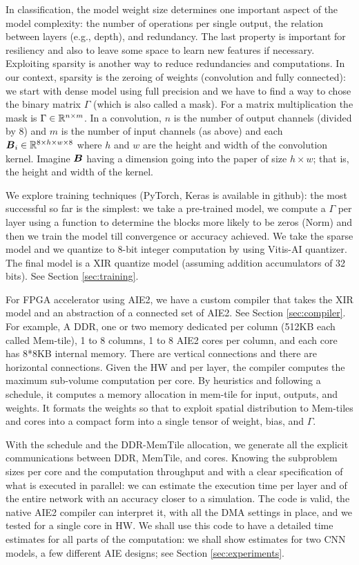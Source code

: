 \documentclass[conference]{IEEEtran}
\begin{document}
In classification, the model weight size determines one important
aspect of the model complexity: the number of operations per single
output, the relation between layers (e.g., depth), and redundancy. The
last property is important for resiliency and also to leave some space
to learn new features if necessary. Exploiting sparsity is another way
to reduce redundancies and computations. In our context, sparsity is
the zeroing of weights (convolution and fully connected): we start
with dense model using full precision and we have to find a way to
chose the binary matrix $\Gamma$ (which is also called a mask). For a
matrix multiplication the mask is $\Gamma \in \mathbb{R}^{n\times m}$. In a
convolution, $n$ is the number of output channels (divided by 8) and
$m$ is the number of input channels (as above) and each ${\boldsymbol B}_i \in
\mathbb{R}^{8\times h \times w \times 8}$ where $h$ and $w$ are the height and
width of the convolution kernel. Imagine ${\boldsymbol B}$ having a dimension
going into the paper of size $h \times w$; that is, the height and
width of the kernel.

We explore training techniques (PyTorch, Keras is available in
github): the most successful so far is the simplest: we take a
pre-trained model, we compute a $\Gamma$ per layer using a function to
determine the blocks more likely to be zeros (Norm) and then we train
the model till convergence or accuracy achieved. We take the sparse
model and we quantize to 8-bit integer computation by using Vitis-AI
quantizer. The final model is a XIR quantize model (assuming addition
accumulators of 32 bits). See Section \ref{sec:training}.

For FPGA accelerator using AIE2, we have a custom compiler that takes
the XIR model and an abstraction of a connected set of AIE2. See
Section \ref{sec:compiler}. For example, A DDR, one or two memory
dedicated per column (512KB each called Mem-tile), 1 to 8 columns, 1
to 8 AIE2 cores per column, and each core has 8*8KB internal
memory. There are vertical connections and there are horizontal
connections. Given the HW and per layer, the compiler computes the
maximum sub-volume computation per core. By heuristics and following a
schedule, it computes a memory allocation in mem-tile for input,
outputs, and weights. It formats the weights so that to exploit
spatial distribution to Mem-tiles and cores into a compact form into a
single tensor of weight, bias, and $\Gamma$.

With the schedule and the DDR-MemTile allocation, we generate all the
explicit communications between DDR, MemTile, and cores. Knowing the
subproblem sizes per core and the computation throughput and with a
clear specification of what is executed in parallel: we can estimate
the execution time per layer and of the entire network with an
accuracy closer to a simulation. The code is valid, the native AIE2
compiler can interpret it, with all the DMA settings in place, and we
tested for a single core in HW.  We shall use this code to have a
detailed time estimates for all parts of the computation: we shall
show estimates for two CNN models, a few different AIE designs; see
Section \ref{sec:experiments}.
\end{document}
